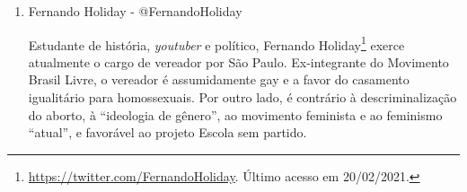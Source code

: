 \documentclass[
	12pt,				%
	openright,			%
	twoside,			%
	a4paper,			%
	english,			%
	brazil				%
	]{abntex2}
\begin{document}
\begin{anexosenv}
\begin{enumerate}
 \begin{figure}[!htbp]
    \centering
    \texttt{[image: fs\_4.png]}
    \caption{Postagem no Twitter de Fernanda Salles. Disponível em \url{https://twitter.com/reportersalles/status/1179506520779870208}. Último acesso em 23/02/2021.}
 \end{figure}
 
 \begin{figure}[!htbp]
    \centering
    \texttt{[image: fs\_1.png]}
    \caption{Postagem no Twitter de Fernanda Salles. Disponível em \url{https://twitter.com/reportersalles/status/1186645698109956097}. Último acesso em 23/02/2021.}
 \end{figure}
 
 
 
 \newpage
  
 \item Fernando Holiday - @FernandoHoliday
 
 Estudante de história, \textit{youtuber} e político, Fernando Holiday\footnote{\url{https://twitter.com/FernandoHoliday}. Último acesso em 20/02/2021.} exerce atualmente o cargo de vereador por São Paulo. Ex-integrante do Movimento Brasil Livre, o vereador é assumidamente gay e a favor do casamento igualitário para homossexuais. Por outro lado, é contrário à descriminalização do aborto, à ``ideologia de gênero'', ao movimento feminista e ao feminismo ``atual'', e favorável ao projeto Escola sem partido.
 
 

\end{enumerate}
\end{anexosenv}
\end{document}
